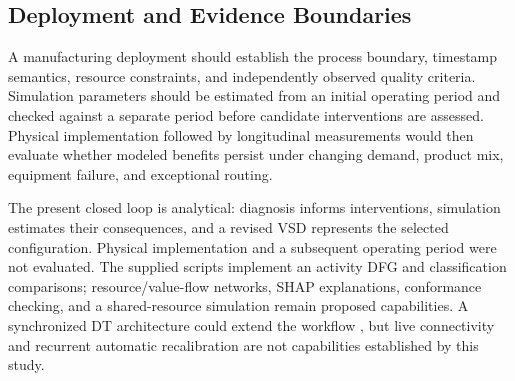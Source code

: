 \subsection{Deployment and Evidence Boundaries}

A manufacturing deployment should establish the process boundary, timestamp semantics, resource constraints, and independently observed quality criteria. Simulation parameters should be estimated from an initial operating period and checked against a separate period before candidate interventions are assessed. Physical implementation followed by longitudinal measurements would then evaluate whether modeled benefits persist under changing demand, product mix, equipment failure, and exceptional routing.

The present closed loop is analytical: diagnosis informs interventions, simulation estimates their consequences, and a revised VSD represents the selected configuration. Physical implementation and a subsequent operating period were not evaluated. The supplied scripts implement an activity DFG and classification comparisons; resource/value-flow networks, SHAP explanations, conformance checking, and a shared-resource simulation remain proposed capabilities. A synchronized DT architecture could extend the workflow \cite{GrievesVickers2017,Aheleroff2021DTaaS}, but live connectivity and recurrent automatic recalibration are not capabilities established by this study.

